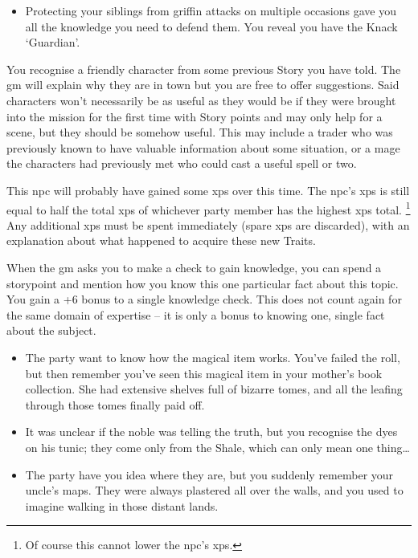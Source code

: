 \begin{multicols}{2}
\begin{itemize}
\item Protecting your siblings from griffin attacks on multiple occasions gave you all the knowledge you need to defend them.
You reveal you have the Knack `Guardian'.
\end{itemize}

\label{oldnpc}
You recognise a friendly character from some previous Story you have told.
The \gls{gm} will explain why they are in town but you are free to offer suggestions.
Said characters won't necessarily be as useful as they would be if they were brought into the mission for the first time with Story points and may only help for a scene, but they should be somehow useful.
This may include a trader who was previously known to have valuable information about some situation, or a mage the characters had previously met who could cast a useful spell or two.

This \gls{npc} will probably have gained some \glspl{xp} over this time.
The \gls{npc}'s \glspl{xp} is still equal to half the total \glspl{xp} of whichever party member has the highest \glspl{xp} total.
\footnote{Of course this cannot lower the \gls{npc}'s \glspl{xp}.}%
Any additional \glspl{xp} must be spent immediately (spare \glspl{xp} are discarded), with an explanation about what happened to acquire these new Traits.

When the \gls{gm} asks you to make a check to gain knowledge, you can spend a \gls{storypoint} and mention how you know this one particular fact about this topic.
You gain a +6 bonus to a single knowledge check.
This does not count again for the same domain of expertise -- it is only a bonus to knowing one, single fact about the subject.

\begin{itemize}
\item
The party want to know how the magical item works.
You've failed the roll, but then remember you've seen this magical item in your mother's book collection.
She had extensive shelves full of bizarre tomes, and all the leafing through those tomes finally paid off.
  \item
  It was unclear if the noble was telling the truth, but you recognise the dyes on his tunic; they come only from the Shale, which can only mean one thing\ldots
  \item
  The party have you idea where they are, but you suddenly remember your uncle's maps.
  They were always plastered all over the walls, and you used to imagine walking in those distant lands.
\end{itemize}


\end{multicols}
